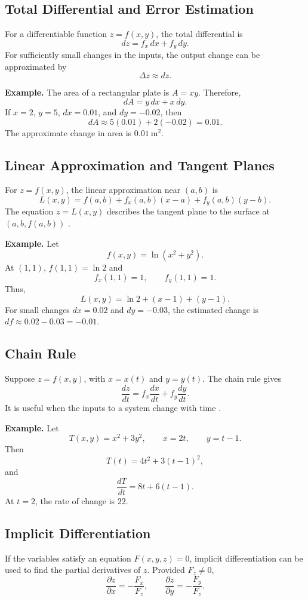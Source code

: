 \documentclass[a4paper,12pt]{article}
\theoremstyle{mystyle}
\numberwithin{equation}{section}
\numberwithin{theorem}{section}
\numberwithin{proposition}{section}
\numberwithin{example}{section}
\numberwithin{remark}{section}
\numberwithin{lemma}{section}
\numberwithin{corollary}{section}
\numberwithin{definition}{section}
\begin{document}
\subsection{Total Differential and Error Estimation}

For a differentiable function \(z=f(x,y)\), the total differential
is
\[
dz=f_x\,dx+f_y\,dy.
\]
For sufficiently small changes in the inputs, the output change can
be approximated by
\[
\Delta z\approx dz.
\]

\textbf{Example.}
The area of a rectangular plate is \(A=xy\). Therefore,
\[
dA=y\,dx+x\,dy.
\]
If \(x=2\), \(y=5\), \(dx=0.01\), and \(dy=-0.02\), then
\[
dA\approx 5(0.01)+2(-0.02)=0.01.
\]
The approximate change in area is \(0.01\ \mathrm{m}^2\).

\subsection{Linear Approximation and Tangent Planes}

For \(z=f(x,y)\), the linear approximation near \((a,b)\) is
\[
L(x,y)=f(a,b)+f_x(a,b)(x-a)+f_y(a,b)(y-b).
\]
The equation \(z=L(x,y)\) describes the tangent plane to the surface
at \((a,b,f(a,b))\) \cite{openstaxtangent}.

\textbf{Example.}
Let
\[
f(x,y)=\ln(x^2+y^2).
\]
At \((1,1)\), \(f(1,1)=\ln2\) and
\[
f_x(1,1)=1,\qquad f_y(1,1)=1.
\]
Thus,
\[
L(x,y)=\ln2+(x-1)+(y-1).
\]
For small changes \(dx=0.02\) and \(dy=-0.03\), the estimated
change is \(df\approx0.02-0.03=-0.01\).

\subsection{Chain Rule}

Suppose \(z=f(x,y)\), with \(x=x(t)\) and \(y=y(t)\). The chain rule
gives
\[
\frac{dz}{dt}
=f_x\frac{dx}{dt}+f_y\frac{dy}{dt}.
\]
It is useful when the inputs to a system change with time
\cite{openstaxchain}.

\textbf{Example.}
Let
\[
T(x,y)=x^2+3y^2,\qquad x=2t,\qquad y=t-1.
\]
Then
\[
T(t)=4t^2+3(t-1)^2,
\]
and
\[
\frac{dT}{dt}=8t+6(t-1).
\]
At \(t=2\), the rate of change is \(22\).

\subsection{Implicit Differentiation}

If the variables satisfy an equation \(F(x,y,z)=0\), implicit
differentiation can be used to find the partial derivatives of
\(z\). Provided \(F_z\ne0\),
\[
\frac{\partial z}{\partial x}=-\frac{F_x}{F_z},
\qquad
\frac{\partial z}{\partial y}=-\frac{F_y}{F_z}.
\]
\end{document}
